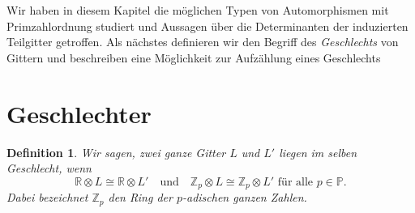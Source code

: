 \documentclass[12pt,a4paper,halfparskip,headsepline,bibtotocnumbered]{scrreprt}
\theoremstyle{nummermitklammern}
\newtheorem{definition}[defsatzusw]{Definition}
\theoremstyle{nonumberbreak}
\newcommand{\Z}{\mathbb{Z}}
\newcommand{\R}{\mathbb{R}}
\renewcommand{\P}{\mathbb{P}}
\begin{document}
Wir haben in diesem Kapitel die möglichen Typen von Automorphismen mit Primzahlordnung studiert und Aussagen über die Determinanten der induzierten Teilgitter getroffen. Als nächstes definieren wir den Begriff des \textit{Geschlechts} von Gittern und beschreiben eine Möglichkeit zur Aufzählung eines Geschlechts

\section{Geschlechter}

\begin{framed}
	\begin{definition}
		Wir sagen, zwei ganze Gitter $L$ und $L'$ liegen im selben \textit{Geschlecht}, wenn
		\begin{equation*}
			\R \otimes L \cong \R \otimes L' \quad \text{und} \quad \Z_p \otimes L \cong \Z_p \otimes L' \text{ für alle } p \in \P. 
		\end{equation*}
		Dabei bezeichnet $\Z_p$ den Ring der $p$-adischen ganzen Zahlen.
	\end{definition}
\end{framed}
\end{document}
